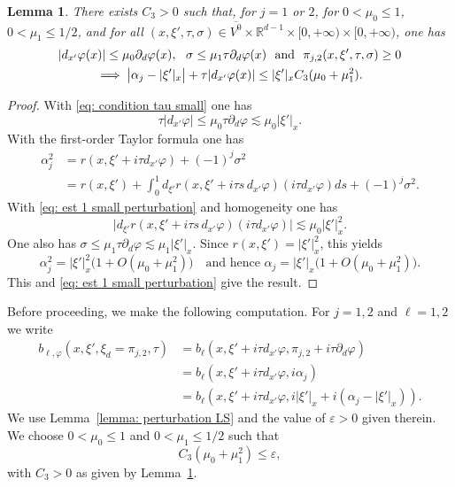 \documentclass[10pt]{amsart}
\theoremstyle{plain}
\newtheorem{lemma}[theorem]{Lemma}
\theoremstyle{definition}
\def\R{\mathbb{R}}
\let\eps\varepsilon
\let \Im \relax
\DeclareMathOperator{\Im}{Im}
\newcommand{\ovl}[1]{\overline{#1}}
\begin{document}
\begin{lemma}
\label{lemma: small perturbation}
There exists $C_3>0$ such that, for $j=1$ or $2$, for $0<\mu_0\leq
1$, $0< \mu_1\leq 1/2$, and for all
$(x, \xi', \tau, \sigma) \in
\ovl{V^0}\times\R^{d-1}\times[0,+\infty) \times[0,+\infty) $,
one has\vspace*{-3pt}
\begin{multline*}
|d_{x'}\varphi(x)|\leq \mu_0\partial_d\varphi(x),
\ \ \sigma\leq \mu_1\tau \partial_d \varphi(x)
\ \ \text{and} \ \
\Im \pi_{j,2} (x,\xi',\tau,\sigma)\geq 0 \\
\implies
\big| \alpha_j-|\xi'|_x\big|+\tau|d_{x'}\varphi(x)|
\leq |\xi'|_x C_3 (\mu_0+\mu_1^2).
\end{multline*}
\end{lemma}
\begin{proof}
With \eqref{eq: condition tau small} one has\vspace*{-3pt}
\begin{equation}
\label{eq: est 1 small perturbation}
\tau|d_{x'}\varphi| \leq \mu_0 \tau \partial_d\varphi
\lesssim \mu_0 |\xi'|_x.
\end{equation}
With the first-order Taylor formula one has
\begin{align*}
\alpha_j^2 &= r(x,\xi'+i\tau d_{x'}\varphi)+(-1)^j\sigma^2\\
&= r(x,\xi')
+\int_{0}^1 d_{\xi'}r(x,\xi'+i \tau s\, d_{x'}\varphi)
(i \tau d_{x'}\varphi)ds
+(-1)^j\sigma^2.
\end{align*}
With \eqref{eq: est 1 small perturbation} and homogeneity one
has\vspace*{-3pt}
\begin{equation*}
\big|
d_{\xi'}r(x,\xi'+i \tau s\, d_{x'}\varphi) (i \tau d_{x'}\varphi)
\big|
\lesssim \mu_0 |\xi'|_x^2.
\end{equation*}
One also has $\sigma \leq \mu_1 \tau \partial_d\varphi
\lesssim \mu_1 |\xi'|_x$.
Since $r(x,\xi') = |\xi'|_x^2$, this yields
\[
\alpha_j^2 = |\xi'|_x^2 \big(1 + O (\mu_0 + \mu_1^2)\big)\quad\text{and hence }\alpha_j = |\xi'|_x \big(1 + O (\mu_0 + \mu_1^2)\big).
\]
This and
\eqref{eq: est 1 small perturbation} give the result.
\end{proof}

Before proceeding, we make the following computation. For $j=1,2$
and $\ell=1,2$ we write
\begin{equation}
\label{lop6}
\begin{split}
b_{\ell,\varphi} (x,\xi',\xi_d =\pi_{j,2},\tau)
&=b_\ell(x,\xi'+i\tau d_{x'}\varphi, \pi_{j,2}+i\tau\partial_d\varphi) \\
&= b_\ell(x,\xi'+i\tau d_{x'}\varphi, i\alpha_j)\\
&=b_\ell(x,\xi'+i\tau d_{x'}\varphi, i|\xi'|_x+i(\alpha_j-|\xi'|_x)).
\end{split}
\end{equation}
We use Lemma~\ref{lemma: perturbation LS} and the value of $\eps>0$
given therein.
We choose $0< \mu_0\leq 1$ and $0 < \mu_1 \leq 1/2$ such that
\begin{equation}
\label{eq: uniform condition mu0 mu1 small}
C_3 (\mu_0+\mu_1^2) \leq \eps,
\end{equation}
with $C_3>0$ as given by Lemma~\ref{lemma: small perturbation}.
\end{document}
